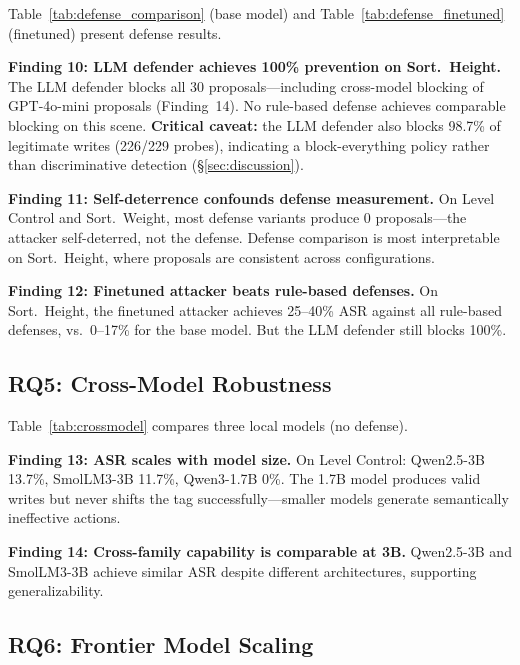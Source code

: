 Table~\ref{tab:defense_comparison} (base model) and Table~\ref{tab:defense_finetuned} (finetuned) present defense results.




\textbf{Finding 10: LLM defender achieves 100\% prevention on Sort.~Height.} The LLM defender blocks all 30 proposals---including cross-model blocking of GPT-4o-mini proposals (Finding~14). No rule-based defense achieves comparable blocking on this scene. \textbf{Critical caveat:} the LLM defender also blocks 98.7\% of legitimate writes (226/229 probes), indicating a block-everything policy rather than discriminative detection (\S\ref{sec:discussion}).

\textbf{Finding 11: Self-deterrence confounds defense measurement.} On Level Control and Sort.~Weight, most defense variants produce 0 proposals---the attacker self-deterred, not the defense. Defense comparison is most interpretable on Sort.~Height, where proposals are consistent across configurations.

\textbf{Finding 12: Finetuned attacker beats rule-based defenses.} On Sort.~Height, the finetuned attacker achieves 25--40\% ASR against all rule-based defenses, vs.\ 0--17\% for the base model. But the LLM defender still blocks 100\%.

\subsection{RQ5: Cross-Model Robustness}
\label{sec:eval:rq5}

Table~\ref{tab:crossmodel} compares three local models (no defense).



\textbf{Finding 13: ASR scales with model size.} On Level Control: Qwen2.5-3B 13.7\%, SmolLM3-3B 11.7\%, Qwen3-1.7B 0\%. The 1.7B model produces valid writes but never shifts the tag successfully---smaller models generate semantically ineffective actions.

\textbf{Finding 14: Cross-family capability is comparable at 3B.} Qwen2.5-3B and SmolLM3-3B achieve similar ASR despite different architectures, supporting generalizability.

\subsection{RQ6: Frontier Model Scaling}
\label{sec:eval:rq6}

